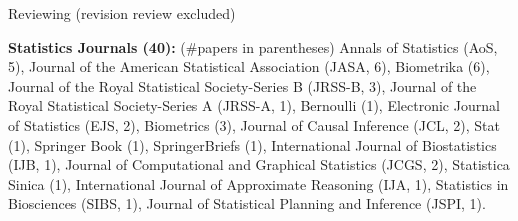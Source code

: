 \documentclass{article}
\begin{document}
\vspace{5mm}











\vspace{5mm}
\begin{large}
\noindent Reviewing (revision review excluded)
\end{large}

\vspace{2mm}
\noindent \textbf{Statistics Journals (40): }(\#papers in parentheses) Annals of Statistics (AoS, 5), Journal of the American Statistical Association (JASA, 6), Biometrika (6), Journal of the Royal Statistical Society-Series B (JRSS-B, 3), Journal of the Royal Statistical Society-Series A (JRSS-A, 1), Bernoulli (1), Electronic Journal of Statistics (EJS, 2), Biometrics (3), Journal of Causal Inference (JCL, 2), Stat (1), Springer Book (1), SpringerBriefs (1), International Journal of Biostatistics (IJB, 1), Journal of Computational and Graphical Statistics (JCGS, 2), Statistica Sinica (1), International Journal of Approximate Reasoning (IJA, 1), Statistics in Biosciences (SIBS, 1), Journal of Statistical Planning and Inference (JSPI, 1).
\end{document}
